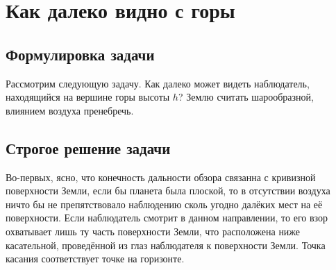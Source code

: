 \documentclass[titlepage]{article}
\begin{document}
\section{Как далеко видно с горы}

\subsection{Формулировка задачи}
Рассмотрим следующую задачу. Как далеко может видеть наблюдатель, находящийся на вершине горы высоты $h$? Землю считать шарообразной, влиянием воздуха пренебречь. 

\subsection{Строгое решение задачи}
Во\--первых, ясно, что конечность дальности обзора связанна с кривизной поверхности Земли, если бы планета была плоской, то в отсутствии воздуха ничто бы не препятствовало наблюдению сколь угодно далёких мест на её поверхности. Если наблюдатель смотрит в данном направлении, то его взор охватывает лишь ту часть поверхности Земли, что расположена ниже касательной, проведённой из глаз наблюдателя к поверхности Земли. Точка касания соответствует точке на горизонте. 
\end{document}
